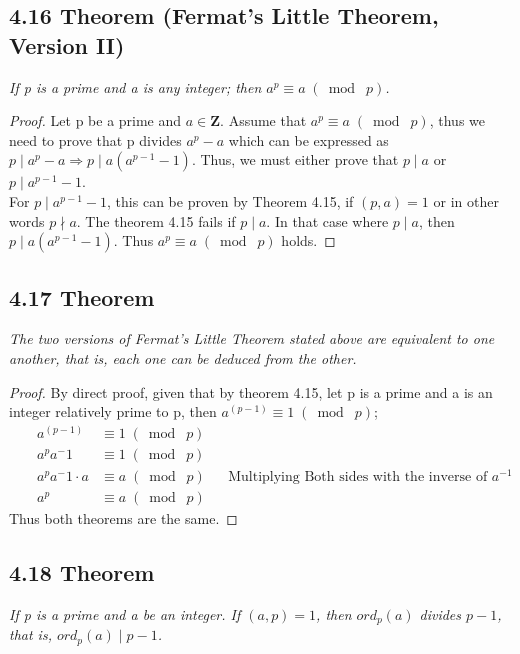\documentclass{article}
\begin{document}
\subsection*{4.16 Theorem (Fermat's Little Theorem, Version II)} 
\quad \textit{If p is a prime and a is any integer; then $a^{p} \equiv a \;(\bmod\; p)$.}

\begin{proof}
Let p be a prime and $a \in \mathbf{Z}$. Assume that $a^{p} \equiv a \;(\bmod\; p)$, thus we need to prove that p divides $a^{p} - a$ which can be expressed as $p \mid a^{p} - a \Longrightarrow p \mid a(a^{p-1} - 1)$. Thus, we must either prove that $p \mid a$ or $p \mid a^{p-1} - 1$.\\
For $p \mid a^{p-1} - 1$, this can be proven by Theorem 4.15, if $(p, a) = 1$ or in other words $p \nmid a$. The theorem 4.15 fails if $p \mid a$. In that case where $p \mid a$, then $p \mid a(a^{p-1} - 1)$. Thus $a^{p} \equiv a \;(\bmod\; p)$ holds.
\end{proof}

\subsection*{4.17 Theorem} 
\quad \textit{The two versions of Fermat's Little Theorem stated above are equivalent to one another, that is, each one can be deduced from the other.}

\begin{proof}
By direct proof, given that by theorem 4.15, let p is a prime and a is an integer relatively prime to p, then $a^{(p-1)} \equiv 1 \;(\bmod\; p)$;
\begin{align*}
    &&a^{(p-1)} &\equiv 1 \;(\bmod\; p)&&\\
    &&a^{p}a^-1 &\equiv 1 \;(\bmod\; p)&&\\
    &&a^{p}a^-1 \cdot a &\equiv a \;(\bmod\; p)&& \text{Multiplying Both sides with the inverse of $a^{-1}$}\\
    &&a^{p} &\equiv a \;(\bmod\; p)&&
\end{align*}
Thus both theorems are the same.
\end{proof}

\subsection*{4.18 Theorem} 
\quad \textit{If p is a prime and a be an integer. If $(a,p) = 1$, then $ord_p(a)$ divides $p-1$, that is, $ord_p(a) \mid p-1$.}
\end{document}
